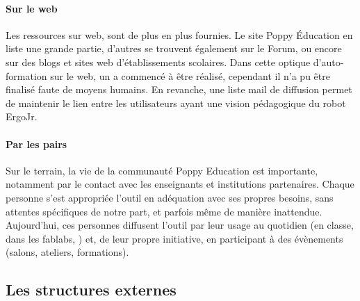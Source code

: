         \paragraph{Sur le web}
            Les ressources sur web, sont de plus en plus fournies. Le site Poppy Éducation en liste une grande partie, d'autres se trouvent également sur le Forum, ou encore sur des blogs et sites web d'établissements scolaires. Dans cette optique d'auto-formation sur le web, un  a commencé à être réalisé, cependant il n'a pu être finalisé faute de moyens humains. En revanche, une liste mail de diffusion permet de maintenir le lien entre les utilisateurs ayant une vision pédagogique du robot ErgoJr.
        \paragraph{Par les pairs}
            Sur le terrain, la vie de la communauté Poppy Education est importante, notamment par le contact avec les enseignants et institutions partenaires. %
            Chaque personne s'est appropriée l'outil en adéquation avec ses propres besoins, sans attentes spécifiques de notre part, et parfois même de manière inattendue. Aujourd'hui, ces personnes diffusent l'outil par leur usage au quotidien (en classe, dans les fablabs, \etc) et, de leur propre initiative, en participant à des évènements (salons, ateliers, formations).  %
    \subsection{Les structures externes}\label{sec:externe}
